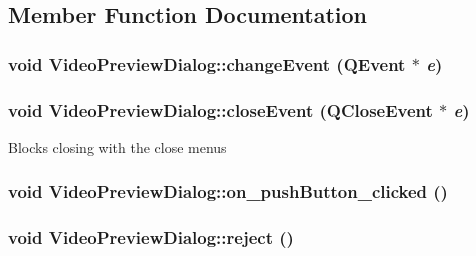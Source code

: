 \subsection{Member Function Documentation}
\hypertarget{class_video_preview_dialog_f5a90a8ebc974bb4434d5ccdc98dae06}{
\subsubsection[{changeEvent}]{\setlength{\rightskip}{0pt plus 5cm}void VideoPreviewDialog::changeEvent (QEvent $\ast$ {\em e})}}
\label{class_video_preview_dialog_f5a90a8ebc974bb4434d5ccdc98dae06}


\hypertarget{class_video_preview_dialog_e80cfa06c5c8d11376dba65ac919cbd3}{
\subsubsection[{closeEvent}]{\setlength{\rightskip}{0pt plus 5cm}void VideoPreviewDialog::closeEvent (QCloseEvent $\ast$ {\em e})}}
\label{class_video_preview_dialog_e80cfa06c5c8d11376dba65ac919cbd3}


Blocks closing with the close menus \hypertarget{class_video_preview_dialog_b28df1893dadda505b0eeb287b51a71c}{
\subsubsection[{on\_\-pushButton\_\-clicked}]{\setlength{\rightskip}{0pt plus 5cm}void VideoPreviewDialog::on\_\-pushButton\_\-clicked ()}}
\label{class_video_preview_dialog_b28df1893dadda505b0eeb287b51a71c}


\hypertarget{class_video_preview_dialog_050685f1b0dd64ec1bf2610ef45cc155}{
\subsubsection[{reject}]{\setlength{\rightskip}{0pt plus 5cm}void VideoPreviewDialog::reject ()}}
\label{class_video_preview_dialog_050685f1b0dd64ec1bf2610ef45cc155}



